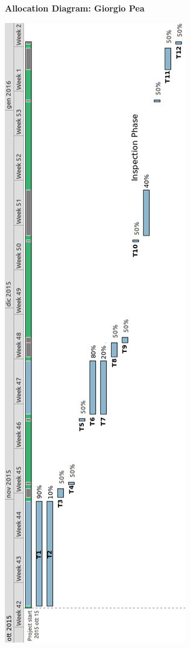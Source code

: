 \documentclass[11pt,titlepage]{article} %
\begin{document}
  \newpage
  \textbf{Allocation Diagram: Giorgio Pea}\newline
  \begin{center}
       \includegraphics[scale=0.4]{res2.png}
  \end{center}
\end{document}
